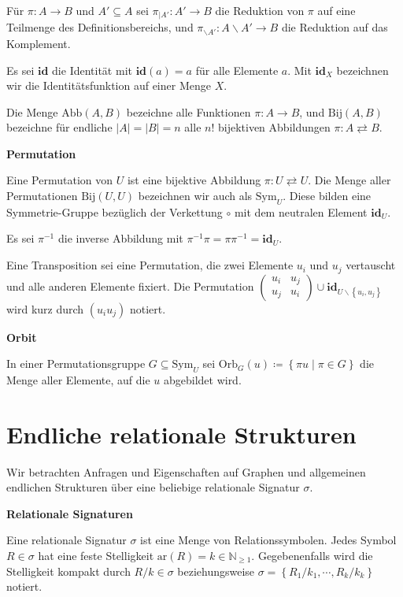 \begin{defn}
Für $\pi:A\rightarrow B$ und $A'\subseteq A$ sei $\pi_{\mid A'}:A'\rightarrow B$
die Reduktion von $\pi$ auf eine Teilmenge des Definitionsbereichs,
und $\pi_{\backslash A'}:A\backslash A'\rightarrow B$ die Reduktion
auf das Komplement.

Es sei $\mathbf{id}$ die Identität mit $\mathbf{id}\left(a\right)=a$
für alle Elemente $a$. Mit $\mathbf{id}_{X}$ bezeichnen wir die
Identitätsfunktion auf einer Menge $X$.

Die Menge $\mathrm{Abb}\left(A,B\right)$ bezeichne alle Funktionen
$\pi:A\rightarrow B$, und $\mathrm{Bij}\left(A,B\right)$ bezeichne
für endliche $\left|A\right|=\left|B\right|=n$ alle $n!$ bijektiven
Abbildungen $\pi:A\rightleftarrows B$.
\end{defn}

\begin{defn}
\textbf{Permutation}

Eine Permutation von $U$ ist eine bijektive Abbildung $\pi:U\rightleftarrows U$.
Die Menge aller Permutationen $\mathrm{Bij}\left(U,U\right)$ bezeichnen
wir auch als $\mathrm{Sym}_{U}$. Diese bilden eine Symmetrie-Gruppe
bezüglich der Verkettung $\circ$ mit dem neutralen Element $\mathbf{id}_{U}$.

Es sei $\pi^{-1}$ die inverse Abbildung mit $\pi^{-1}\pi=\pi\pi^{-1}=\mathbf{id}_{U}$.

Eine Transposition sei eine Permutation, die zwei Elemente $u_{i}$
und $u_{j}$ vertauscht und alle anderen Elemente fixiert. Die Permutation
$\left(\begin{array}{cc}
u_{i} & u_{j}\\
u_{j} & u_{i}
\end{array}\right)\cup\mathbf{id}_{U\backslash\left\{ u_{i},u_{j}\right\} }$ wird kurz durch $\left(u_{i}u_{j}\right)$ notiert.
\end{defn}

\begin{defn}
\textbf{\label{def:orbit}Orbit}

In einer Permutationsgruppe $G\subseteq\mathrm{Sym}_{U}$ sei $\mathrm{Orb}_{G}\left(u\right)\coloneqq\left\{ \pi u\mid\pi\in G\right\} $
die Menge aller Elemente, auf die $u$ abgebildet wird.
\end{defn}

\section{Endliche relationale Strukturen}

Wir betrachten Anfragen und Eigenschaften auf Graphen und allgemeinen
endlichen Strukturen über eine beliebige relationale Signatur $\sigma$.
\begin{defn}
\textbf{Relationale Signaturen}

Eine relationale Signatur $\sigma$ ist eine Menge von Relationssymbolen.
Jedes Symbol $R\in\sigma$ hat eine feste Stelligkeit $\mathrm{ar}\left(R\right)=k\in\mathbb{N}_{\geqslant1}$.
Gegebenenfalls wird die Stelligkeit kompakt durch $R/k\in\sigma$
beziehungsweise $\sigma=\left\{ R_{1}/k_{1},\cdots,R_{k}/k_{k}\right\} $
notiert.
\end{defn}

